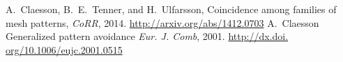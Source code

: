 \documentclass[11pt,a4paper]{article}
\theoremstyle{definition}
\newenvironment{talkBibliog}{\begin{thebibliography}{9}\small}{\end{thebibliography}}
\begin{document}

\begin{talkBibliog}
  A.~Claesson, B.~E.~Tenner, and H.~Ulfarsson,
  Coincidence among families of mesh patterns,
  \emph{CoRR}, 2014.
  \url{http://arxiv.org/abs/1412.0703}
 A.~Claesson
 \newblock Generalized pattern avoidance
 \emph{Eur. J. Comb}, 2001.
 \url{http://dx.doi. org/10.1006/eujc.2001.0515}
\end{talkBibliog}

\endgroup
\end{document}
